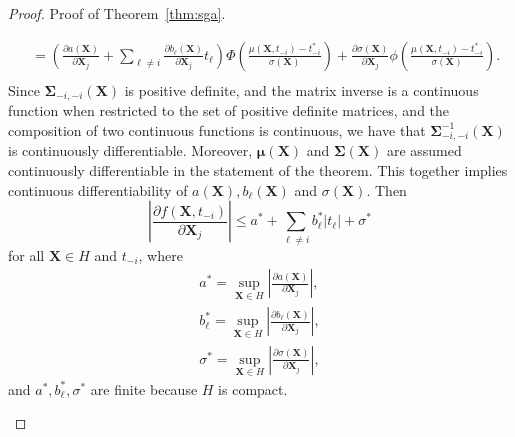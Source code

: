 \documentclass[paper=letter]{scrartcl}
\begin{document}
\begin{proof}{Proof of Theorem~\ref{thm:sga}.}
\begin{enumerate}
\begin{equation}
\begin{split}
       &= \left(\frac{\partial a(\bm{X})}{\partial \bm{X}_j} + \sum_{\ell \ne i} \frac{\partial b_{\ell}(\bm{X})}{\partial \bm{X}_j} t_{\ell} \right) \Phi \left( \frac{\mu(\bm{X}, t_{-i})-t^*_{-i}}{\sigma(\bm{X})} \right) + \frac{\partial \sigma(\bm{X})}{\partial \bm{X}_j} \phi \left( \frac{\mu(\bm{X}, t_{-i})-t^*_{-i}}{\sigma(\bm{X})} \right). \\
       \end{split}
      \end{equation}
      Since $\bm{\Sigma}_{-i,-i}(\bm{X})$ is positive definite, and the matrix inverse is a continuous function when restricted to the set of positive definite matrices, and the composition of two continuous functions is continuous, we have that 
     $\bm{\Sigma}_{-i,-i}^{-1}(\bm{X})$ is continuously differentiable.
     Moreover, $\bm{\mu}(\bm{X})$ and $\bm{\Sigma}(\bm{X})$ are assumed continuously differentiable in the statement of the theorem. This together implies continuous differentiability of $a(\bm{X}), b_{\ell}(\bm{X})$ and $\sigma(\bm{X})$. Then
      \begin{equation*}
       \left\lvert \frac{\partial f(\bm{X}, t_{-i})}{\partial \bm{X}_j} \right\rvert \le a^* + \sum_{\ell \ne i} b^*_{\ell} \lvert t_{\ell} \rvert + \sigma^*
      \end{equation*}
      for all $\bm{X} \in H$ and $t_{-i}$, where
      \begin{equation*}
       \begin{split}
           a^* = \sup_{\bm{X}\in H} \left\lvert \frac{\partial a(\bm{X})}{\partial \bm{X}_j} \right\rvert, \\
           b_{\ell}^* = \sup_{\bm{X}\in H} \left\lvert \frac{\partial b_{\ell}(\bm{X})}{\partial \bm{X}_j} \right\rvert, \\
           \sigma^* = \sup_{\bm{X}\in H} \left\lvert \frac{\partial \sigma(\bm{X})}{\partial \bm{X}_j} \right\rvert,
       \end{split}
      \end{equation*}
      and $a^*, b_{\ell}^*, \sigma^*$ are finite because $H$ is compact.
      

\end{enumerate}
\end{proof}
\end{document}
